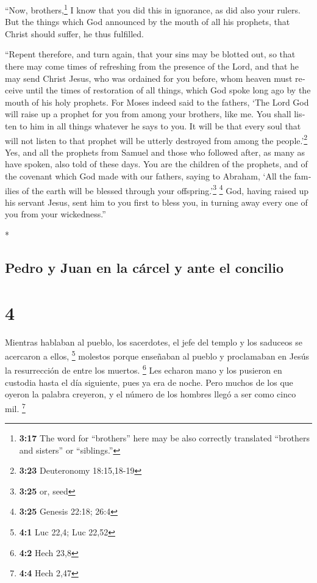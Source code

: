 \begin{paracol}{2}
\begin{otherlanguage}{english}
 ``Now, brothers,\footnote{\textbf{3:17} The word for
  ``brothers'' here may be also correctly translated ``brothers and
  sisters'' or ``siblings.''} I know that you did this in ignorance, as
did also your rulers.  But the things which God announced
by the mouth of all his prophets, that Christ should suffer, he thus
fulfilled.

 ``Repent therefore, and turn again, that your sins may
be blotted out, so that there may come times of refreshing from the
presence of the Lord,  and that he may send Christ Jesus,
who was ordained for you before,  whom heaven must
receive until the times of restoration of all things, which God spoke
long ago by the mouth of his holy prophets.  For Moses
indeed said to the fathers, `The Lord God will raise up a prophet for
you from among your brothers, like me. You shall listen to him in all
things whatever he says to you.  It will be that every
soul that will not listen to that prophet will be utterly destroyed from
among the people.'\footnote{\textbf{3:23} Deuteronomy 18:15,18-19}
 Yes, and all the prophets from Samuel and those who
followed after, as many as have spoken, also told of these days.
 You are the children of the prophets, and of the
covenant which God made with our fathers, saying to Abraham, `All the
families of the earth will be blessed through your
offspring.'\footnote{\textbf{3:25} or, seed} \footnote{\textbf{3:25}
  Genesis 22:18; 26:4}  God, having raised up his servant
Jesus, sent him to you first to bless you, in turning away every one of
you from your wickedness.''

\end{otherlanguage}

\switchcolumn[0]*

\hypertarget{pedro-y-juan-en-la-cuxe1rcel-y-ante-el-concilio}{%
\subsection{Pedro y Juan en la cárcel y ante el
concilio}\label{pedro-y-juan-en-la-cuxe1rcel-y-ante-el-concilio}}

\hypertarget{section-6}{%
\section{4}\label{section-6}}

 Mientras hablaban al pueblo, los sacerdotes, el jefe del
templo y los saduceos se acercaron a ellos, \footnote{\textbf{4:1} Luc
  22,4; Luc 22,52}  molestos porque enseñaban al pueblo y
proclamaban en Jesús la resurrección de entre los muertos. \footnote{\textbf{4:2}
  Hech 23,8}  Les echaron mano y los pusieron en custodia
hasta el día siguiente, pues ya era de noche.  Pero muchos
de los que oyeron la palabra creyeron, y el número de los hombres llegó
a ser como cinco mil. \footnote{\textbf{4:4} Hech 2,47}


\end{paracol}
